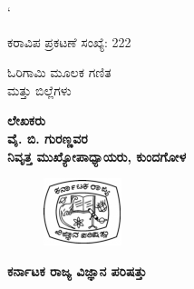 
`~

\hfill{ಕರಾವಿಪ ಪ್ರಕಟಣೆ ಸಂಖ್ಯೆ: {\rm 222}}


\vfill 

\thispagestyle{empty}
\begin{center}
{\fontsize{30}{32}\selectfont ಓರಿಗಾಮಿ ಮೂಲಕ ಗಣಿತ \\[0.2cm]
 ಮತ್ತು ಬಿಲ್ಲೆಗಳು}
\vfill


{\Large\bfseries ಲೇಖಕರು}\\[4pt]
{\LARGE\bfseries ವೈ. ಬಿ. ಗುರಣ್ಣವರ }\\[4pt]
{\LARGE\bfseries ನಿವೃತ್ತ ಮುಖ್ಯೋಪಾಧ್ಯಾಯರು, ಕುಂದಗೋಳ}

\vfill

\begin{figure}[H]
\centering
\includegraphics[scale=.7]{src/figure/logo.jpg}
\end{figure}

{\Large\bfseries ಕರ್ನಾಟಕ ರಾಜ್ಯ ವಿಜ್ಞಾನ ಪರಿಷತ್ತು}


\end{center}
